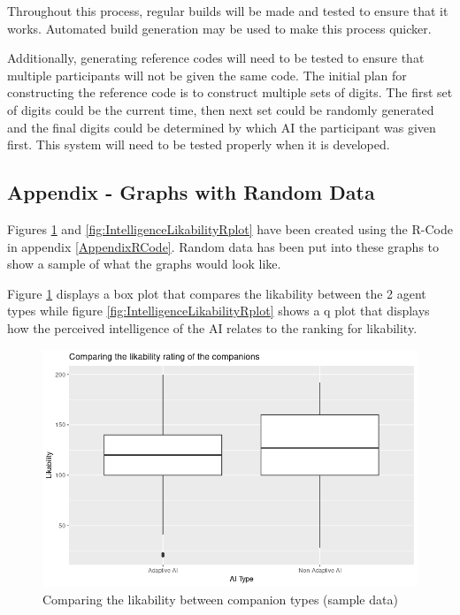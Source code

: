 \documentclass{IEEEtran}
\begin{document}
Throughout this process, regular builds will be made and tested to ensure that it works. Automated build generation may be used to make this process quicker.

Additionally, generating reference codes will need to be tested to ensure that multiple participants will not be given the same code. The initial plan for constructing the reference code is to construct multiple sets of digits. The first set of digits could be the current time, then next set could be randomly generated and the final digits could be determined by which AI the participant was given first. This system will need to be tested properly when it is developed.

\subsection{Appendix - Graphs with Random Data}

Figures \ref{fig:LikabilityRplot} and \ref{fig:IntelligenceLikabilityRplot} have been created using the R-Code in appendix \ref{AppendixRCode}. Random data has been put into these graphs to show a sample of what the graphs would look like.

Figure \ref{fig:LikabilityRplot} displays a box plot that compares the likability between the 2 agent types while figure \ref{fig:IntelligenceLikabilityRplot} shows a q plot that displays how the perceived intelligence of the AI relates to the ranking for likability.

\label{AppendixGraphs}
\begin{figure}[h!]
  \centering
  \includegraphics[width=0.9\linewidth]{Images/Graphs/LikabilityRplot.png}
  
\caption{Comparing the likability between companion types (sample data)}
\label{fig:LikabilityRplot}
\end{figure}
\end{document}
